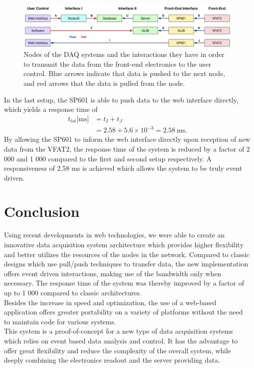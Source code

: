       \begin{figure}[t!]
        \centering
        \includegraphics[width=\textwidth]{img/III-2-web-daq/data_req}
        \caption{Nodes of the DAQ systems and the interactions they have in order to transmit the data from the front-end electronics to the user control. Blue arrows indicate that data is pushed to the next node, and red arrows that the data is pulled from the node.}
        \label{fig:III-2-data-req}
      \end{figure}

      In the last setup, the SP601 is able to push data to the web interface directly, which yields a response time of
      \begin{equation}
        \begin{split}
          t_{tot}\text{[ms]} & = t_I + t_J \\
                             & = 2.58 + 5.6 \times 10^{-3} = 2.58 \ \text{ms}.
        \end{split}
      \end{equation}
      By allowing the SP601 to inform the web interface directly upon reception of new data from the VFAT2, the response time of the system is reduced by a factor of 2 000 and 1 000 compared to the first and second setup respectively. A responsiveness of 2.58 ms is achieved which allows the system to be truly event driven.

  \section{Conclusion}

    Using recent developments in web technologies, we were able to create an innovative data acquisition system architecture which provides higher flexibility and better utilizes the resources of the nodes in the network. Compared to classic designs which use pull/push techniques to transfer data, the new implementation offers event driven interactions, making use of the bandwidth only when necessary. The response time of the system was thereby improved by a factor of up to 1 000 compared to classic architectures. \\

    Besides the increase in speed and optimization, the use of a web-based application offers greater portability on a variety of platforms without the need to maintain code for various systems. \\

    This system is a proof-of-concept for a new type of data acquisition systems which relies on event based data analysis and control. It has the advantage to offer great flexibility and reduce the complexity of the overall system, while deeply combining the electronics readout and the server providing data.
